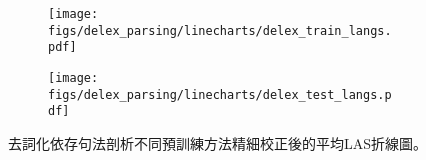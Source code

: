 \begin{figure}[htbp]
    \centering
    \begin{subfigure}[t]{\textwidth}
        \centering
        \texttt{[image: figs/delex\_parsing/linecharts/delex\_train\_langs.pdf]}
    \end{subfigure}
    \vspace{-12pt}
    \begin{subfigure}[t]{\textwidth}
        \centering
        \texttt{[image: figs/delex\_parsing/linecharts/delex\_test\_langs.pdf]}
    \end{subfigure}
    \caption{去詞化依存句法剖析不同預訓練方法精細校正後的平均LAS折線圖。}
    \label{fig:delex_avg}
\end{figure}